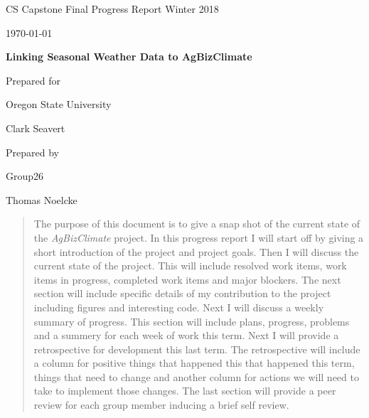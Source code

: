 \documentclass[onecolumn, draftclsnofoot,10pt, compsoc]{article}
\def \CapstoneTeamName{AgBizClimate}
\def \CapstoneTeamNumber{26}
\def \GroupMemberOne{Thomas Noelcke}%
\def \CapstoneProjectName{ Linking Seasonal Weather Data to AgBizClimate\texttrademark}
\def \CapstoneSponsorCompany{ Oregon State University}
\def \CapstoneSponsorPerson{ Clark Seavert}
\def \DocType{		%
				Final Progress Report Winter 2018
				}
\newcommand{\NameSigPair}[1]{\par
\makebox[2.75in][r]{#1} \hfil 	\makebox[3.25in]{\makebox[2.25in]{\hrulefill} \hfill		\makebox[.75in]{\hrulefill}}
\par\vspace{-12pt} \textit{\tiny\noindent
\makebox[2.75in]{} \hfil		\makebox[3.25in]{\makebox[2.25in][r]{Signature} \hfill	\makebox[.75in][r]{Date}}}}
\renewcommand{\NameSigPair}[1]{#1}
\begin{document}
\begin{titlepage}
    \begin{singlespace}
        \hfill
        \par\vspace{.2in}
        \centering
        \scshape{
            \huge CS Capstone \DocType \par
            {\large\today}\par
            \vspace{.5in}
            \textbf{\Huge\CapstoneProjectName}\par
            \vfill
            {\large Prepared for}\par
            \Huge \CapstoneSponsorCompany\par
            \vspace{5pt}
            {\Large\NameSigPair{\CapstoneSponsorPerson}\par}
            {\large Prepared by }\par
            Group\CapstoneTeamNumber\par
            \vspace{5pt}
            {\Large
                \NameSigPair{\GroupMemberOne}\par
            }
            \vspace{20pt}
        }
        \begin{abstract}
					The purpose of this document is to give a snap shot of the current state of the \textit{AgBizClimate} project. In this progress report I will start off by giving a short introduction of the project and project goals. Then I will discuss the current state of the project. This will include resolved work items, work items in progress, completed work items and major blockers. The next section will include specific details of my contribution to the project including figures and interesting code. Next I will discuss a weekly summary of progress. This section will include plans, progress, problems and a summery for each week of work this term. Next I will provide a retrospective for development this last term. The retrospective will include a column for positive things that happened this that happened this term, things that need to change and another column for actions we will need to take to implement those changes. The last section will provide a peer review for each group member inducing a brief self review.\\
        \end{abstract}
    \end{singlespace}
\end{titlepage}
\newpage
{}
\tableofcontents
\newpage
\clearpage
\end{document}

